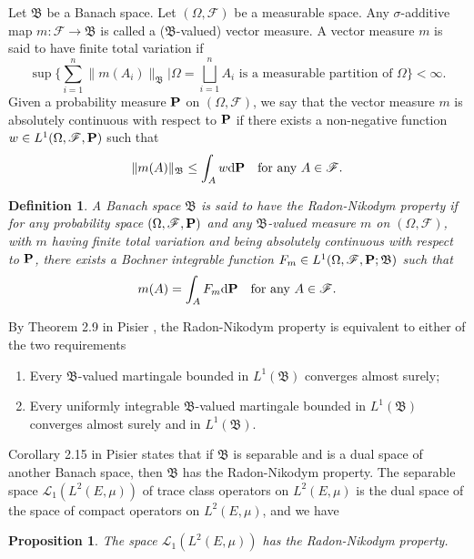 \documentclass[12pt]{paper}
\newtheorem{proposition}[theorem]{Proposition}
\newtheorem{definition}[theorem]{Definition}
\numberwithin{theorem}{section}
\numberwithin{figure}{section}
\numberwithin{equation}{section}
\begin{document}
Let $\mathfrak{B}$ be a Banach space. Let $(\Omega, \mathscr{F})$ be a measurable space. Any $\sigma$-additive map $m: \mathscr{F} \rightarrow \mathfrak{B}$ is called a ($\mathfrak{B}$-valued) vector measure. A vector measure $m$ is said to have finite total variation if
\[
\sup \Big\{\sum_{i=1}^n \| m(A_i) \|_{\mathfrak{B}}  \big|\text{$\Omega = \bigsqcup_{i=1}^n  A_i$ is a measurable partition of $\Omega$} \Big\}< \infty.
\]
Given a probability measure $\bold{P}$ on $(\Omega, \mathscr{F})$, we say that the vector measure $m$ is absolutely continuous with respect to $\bold{P}$ if there exists a non-negative  function $w\in L^1(\Omega, \mathscr{F}, \bold{P})$ such that
\[
\| m(A)\|_{\mathfrak{B}} \le \int_{A} w \mathrm{d} \bold{P}  \quad \text{for any $A\in \mathscr{F}$.}
\]

\begin{definition}
A Banach space $\mathfrak{B}$  is said to have the Radon-Nikodym property if for any probability space $(\Omega, \mathscr{F}, \bold{P})$ and any $\mathfrak{B}$-valued measure $m$ on $(\Omega, \mathscr{F})$, with $m$ having finite total variation and being absolutely continuous with respect to $\bold{P}$, there exists a Bochner integrable function $F_m\in L^1(\Omega, \mathscr{F}, \bold{P}; \mathfrak{B})$ such that
\[
 m(A) =  \int_{A}  F_m \mathrm{d}\bold{P}  \quad \text{for any $A\in \mathscr{F}$.}
\]
\end{definition}
 By Theorem 2.9 in Pisier \cite{pisier-B-martingale}, the Radon-Nikodym property is equivalent to either of
the two requirements
\begin{enumerate}
\item Every $\mathfrak{B}$-valued martingale bounded in $L^1(\mathfrak{B})$ converges almost surely;
\item Every uniformly integrable $\mathfrak{B}$-valued martingale bounded in $L^1(\mathfrak{B})$ converges almost surely and in $L^1(\mathfrak{B})$.
\end{enumerate}

Corollary 2.15 in  Pisier \cite{pisier-B-martingale} states that if $\mathfrak{B}$ is separable and  is a dual space of another Banach space, then $\mathfrak{B}$ has the Radon-Nikodym property.
The separable space $\mathscr{L}_1(L^2(E, \mu))$  of trace class operators on $L^2(E, \mu)$  is the dual space of the space of compact operators on $L^2(E, \mu)$, and we have
\begin{proposition}\label{prop-rnp}
The space  $\mathscr{L}_1(L^2(E, \mu))$ has the Radon-Nikodym property.
\end{proposition}
\end{document}
